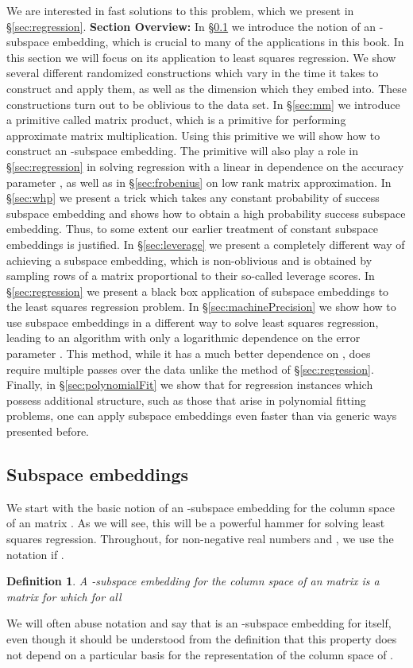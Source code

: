 \documentclass[11pt]{article}
\newtheorem{definition}[theorem]{Definition}
\begin{document}
We are interested in fast solutions to this problem, which we present in \S\ref{sec:regression}. 
{\bf Section Overview:} In \S\ref{sec:se} we introduce the notion of an -subspace embedding, which is crucial to many of the applications in this book. In this section we will focus on its application to least squares regression. We show several different randomized constructions which vary in the time it takes to construct and apply them, as well as the dimension which they embed into. These constructions turn out to be oblivious to the data set. In \S\ref{sec:mm} we introduce a primitive called matrix product, which is a primitive for performing approximate matrix multiplication. Using this primitive we will show how to construct an -subspace embedding. The primitive will also play a role in \S\ref{sec:regression} in solving regression with a linear in  dependence on the accuracy parameter , as well as in \S\ref{sec:frobenius} on low rank matrix approximation. In \S\ref{sec:whp} we present a trick which takes any constant probability of success subspace embedding and shows how to obtain a high probability success subspace embedding. Thus, to some extent our earlier treatment of constant subspace embeddings is justified. In \S\ref{sec:leverage} we present a completely different way of achieving a subspace embedding, which is non-oblivious and is obtained by sampling rows of a matrix proportional to their so-called leverage scores. In \S\ref{sec:regression} we present a black box application of subspace embeddings to the least squares regression problem.  In \S\ref{sec:machinePrecision} we show how to use subspace embeddings in a different way to solve least squares regression, leading to an algorithm with only a logarithmic dependence on the error parameter . This method, while it has a much better dependence on , does require multiple passes over the data unlike the method of \S\ref{sec:regression}. Finally, in \S\ref{sec:polynomialFit} we show that for regression instances which possess additional structure, such as those that arise in polynomial fitting problems, one can apply subspace embeddings even faster than via generic ways presented before. 

\subsection{Subspace embeddings}\label{sec:se}
We start with the basic notion of an -subspace embedding for the column space of an  matrix . 
As we will see, this will be a powerful hammer for solving least squares regression. 
Throughout, for non-negative real numbers  and , we use the notation  if
. 
\begin{definition}\label{def:subspace}
A  -subspace embedding for the column space of an 
 matrix  
is a matrix  for which for all 

\end{definition}
We will often abuse notation and say that  is an -subspace embedding for  itself, even though it should be understood from the definition that this property does not depend on a particular basis for the representation of the column space of . 
\end{document}
